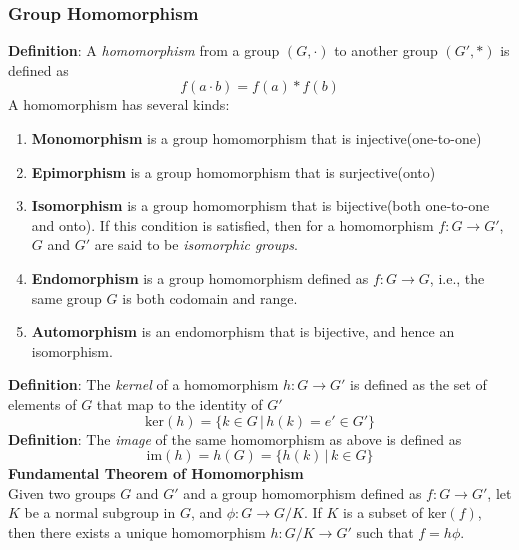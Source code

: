 \documentclass[a4paper, 12pt]{article}
\numberwithin{equation}{section}
\begin{document}
\subsubsection{Group Homomorphism}
\textbf{Definition}: A \textit{homomorphism} from a group $(G, \cdot)$ to another group $(G', *)$ is defined as
\begin{equation}
f(a \cdot b) = f(a) * f(b)
\end{equation}
A homomorphism has several kinds:
\begin{enumerate}
\item \textbf{Monomorphism} is a group homomorphism that is injective(one-to-one)
\item \textbf{Epimorphism} is a group homomorphism that is surjective(onto)
\item \textbf{Isomorphism} is a group homomorphism that is bijective(both one-to-one and onto). If this condition is satisfied, then for a homomorphism $f:G \to G'$, $G$ and $G'$ are said to be \textit{isomorphic groups}.
\item \textbf{Endomorphism} is a group homomorphism defined as $f:G \to G$, i.e., the same group $G$ is both codomain and range.
\item \textbf{Automorphism} is an endomorphism that is bijective, and hence an isomorphism.
\end{enumerate}
\textbf{Definition}: The \textit{kernel} of a homomorphism $h:G \to G'$ is defined as the set of elements of $G$ that map to the identity of $G'$
\begin{equation}
\text{ker}(h) = \{ k \in G \,| \,h(k) = e' \in G' \}
\end{equation}
\textbf{Definition}: The \textit{image} of the same homomorphism as above is defined as
\begin{equation}
\text{im}(h) = h(G) = \{ h(k) \,| \,k \in G \}
\end{equation}
\textbf{Fundamental Theorem of Homomorphism}\\
Given two groups $G$ and $G'$ and a group homomorphism defined as $f: G \to G'$, let $K$ be a normal subgroup in $G$, and $\phi: G \to G/K$. If $K$ is a subset of ker$(f)$, then there exists a unique homomorphism $h:G/K \to G'$ such that $f = h\phi$.
\end{document}
